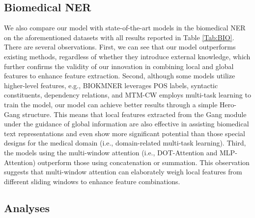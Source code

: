 \documentclass[11pt]{article}
\begin{document}
\subsection{Biomedical NER}
We also compare our model with state-of-the-art models in the biomedical NER on the aforementioned datasets with all results reported in Table \ref{Tab:BIO}.
There are several observations.
First, we can see that our model outperforms existing methods, regardless of whether they introduce external knowledge, which further confirms the validity of our innovation in combining local and global features to enhance feature extraction.
Second, although some models utilize higher-level features, e.g., BIOKMNER leverages POS labels, syntactic constituents, dependency relations, and MTM-CW employs multi-task learning to train the model, our model can achieve better results through a simple Hero-Gang structure.
This means that local features extracted from the Gang module under the guidance of global information are also effective in assisting biomedical text representations and even show more significant potential than those special designs for the medical domain (i.e., domain-related multi-task learning).
Third, the models using the multi-window attention (i.e., DOT-Attention and MLP-Attention) outperform those using concatenation or summation.
This observation suggests that multi-window attention can elaborately weigh local features from different sliding windows to enhance feature combinations.


\subsection{Analyses}
\end{document}
